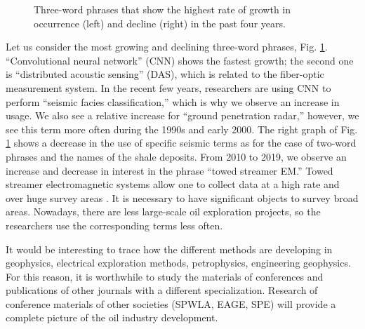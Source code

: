 \documentclass[geosciences,article,submit,moreauthors,pdftex]{Definitions/mdpi}
\begin{document}
\begin{figure}[ht!]


\caption{Three-word phrases that show the highest rate of growth in occurrence (left) and decline (right) in the past four years.}
\label{trigrams}
\end{figure}

Let us consider the most growing and declining three-word phrases, Fig. \ref{trigrams}. ``Convolutional neural network'' (CNN) shows the fastest growth; the second one is ``distributed acoustic sensing'' (DAS), which is related to the fiber-optic measurement system. In the recent few years, researchers are using CNN to perform ``seismic facies classification,'' which is why we observe an increase in usage. We also see a relative increase for ``ground penetration radar,'' however, we see this term more often during the 1990s and early 2000. The right graph of Fig. \ref{trigrams} shows a decrease in the use of specific seismic terms as for the case of two-word phrases and the names of the shale deposits. From 2010 to 2019, we observe an increase and decrease in interest in the phrase ``towed streamer EM.'' Towed streamer electromagnetic systems allow one to collect data at a high rate and over huge survey areas \citep{Zhdanov2015}. It is necessary to have significant objects to survey broad areas. Nowadays, there are less large-scale oil exploration projects, so the researchers use the corresponding terms less often.

It would be interesting to trace how the different methods are developing in geophysics, electrical exploration methods, petrophysics, engineering geophysics. For this reason, it is worthwhile to study the materials of conferences and publications of other journals with a different specialization. Research of conference materials of other societies (SPWLA, EAGE, SPE) will provide a complete picture of the oil industry development.
\end{document}
